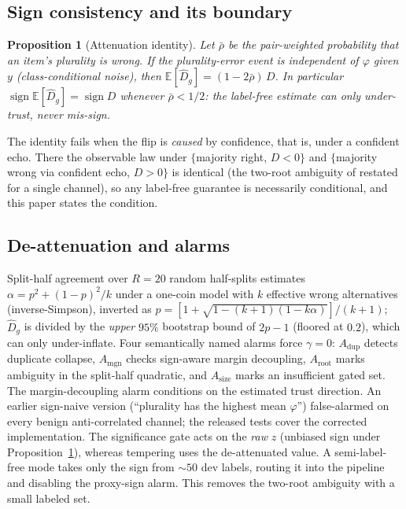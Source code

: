 \documentclass{article}
\newtheorem{proposition}{Proposition}
\newcommand{\Dhat}{\widehat{D}}
\newcommand{\sign}{\operatorname{sign}}
\begin{document}
\subsection{Sign consistency and its boundary}
\begin{proposition}[Attenuation identity]\label{prop:ccn}
Let $\bar\rho$ be the pair-weighted probability that an item's plurality is wrong. If the plurality-error event is independent of $\varphi$ given $y$ (class-conditional noise), then
$\mathbb{E}[\Dhat_g]=(1-2\bar\rho)\,D$.
In particular $\sign\mathbb{E}[\Dhat_g]=\sign D$ whenever $\bar\rho<1/2$: the label-free estimate can only under-trust, never mis-sign.
\end{proposition}
The identity fails when the flip is \emph{caused} by confidence, that is, under a confident echo. There the observable law under $\{$majority right, $D<0\}$ and $\{$majority wrong via confident echo, $D>0\}$ is identical (the two-root ambiguity of \citet{parisi2014ranking} restated for a single channel), so any label-free guarantee is necessarily conditional, and this paper states the condition.

\subsection{De-attenuation and alarms}
Split-half agreement over $R{=}20$ random half-splits estimates $\alpha=p^2+(1-p)^2/k$ under a one-coin model with $k$ effective wrong alternatives (inverse-Simpson), inverted as $p=[1+\sqrt{1-(k{+}1)(1-k\alpha)}]/(k{+}1)$; $\Dhat_g$ is divided by the \emph{upper} $95\%$ bootstrap bound of $2p-1$ (floored at $0.2$), which can only under-inflate. Four semantically named alarms force $\gamma=0$: $A_{\mathrm{dup}}$ detects duplicate collapse, $A_{\mathrm{mgn}}$ checks sign-aware margin decoupling, $A_{\mathrm{root}}$ marks ambiguity in the split-half quadratic, and $A_{\mathrm{size}}$ marks an insufficient gated set. The margin-decoupling alarm conditions on the estimated trust direction. An earlier sign-naive version (``plurality has the highest mean $\varphi$'') false-alarmed on every benign anti-correlated channel; the released tests cover the corrected implementation. The significance gate acts on the \emph{raw} $z$ (unbiased sign under Proposition~\ref{prop:ccn}), whereas tempering uses the de-attenuated value. A semi-label-free mode takes only the sign from ${\sim}50$ dev labels, routing it into the pipeline and disabling the proxy-sign alarm. This removes the two-root ambiguity with a small labeled set.
\end{document}
